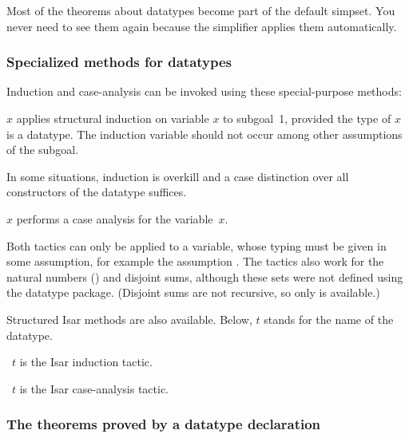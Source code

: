 Most of the theorems about datatypes become part of the default simpset.  You
never need to see them again because the simplifier applies them
automatically.  

\subsubsection{Specialized methods for datatypes}

Induction and case-analysis can be invoked using these special-purpose
methods:
\begin{ttdescription}
\item[\methdx{induct_tac} $x$] applies structural
  induction on variable $x$ to subgoal~1, provided the type of $x$ is a
  datatype.  The induction variable should not occur among other assumptions
  of the subgoal.
\end{ttdescription}
% 
In some situations, induction is overkill and a case distinction over all
constructors of the datatype suffices.
\begin{ttdescription}
\item[\methdx{case_tac} $x$]
 performs a case analysis for the variable~$x$.
\end{ttdescription}

Both tactics can only be applied to a variable, whose typing must be given in
some assumption, for example the assumption .  The tactics
also work for the natural numbers () and disjoint sums, although
these sets were not defined using the datatype package.  (Disjoint sums are
not recursive, so only  is available.)

Structured Isar methods are also available. Below, $t$ 
stands for the name of the datatype.
\begin{ttdescription}
\item[\methdx{induct} \isa{set:}\ $t$] is the Isar induction tactic.
\item[\methdx{cases} \isa{set:}\ $t$] is the Isar case-analysis tactic.
\end{ttdescription}


\subsubsection{The theorems proved by a datatype declaration}

